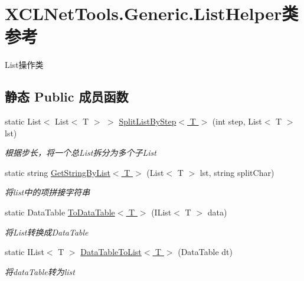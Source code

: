 \hypertarget{class_x_c_l_net_tools_1_1_generic_1_1_list_helper}{\section{X\-C\-L\-Net\-Tools.\-Generic.\-List\-Helper类 参考}
\label{class_x_c_l_net_tools_1_1_generic_1_1_list_helper}
}


List操作类  


\subsection*{静态 Public 成员函数}
\begin{DoxyCompactItemize}
\item 
static List$<$ List$<$ T $>$ $>$ \hyperlink{class_x_c_l_net_tools_1_1_generic_1_1_list_helper_a38adb871b8752fb797795645625b7b4f}{Split\-List\-By\-Step$<$ T $>$} (int step, List$<$ T $>$ lst)
\begin{DoxyCompactList}\small\item\em 根据步长，将一个总\-List拆分为多个子\-List \end{DoxyCompactList}\item 
static string \hyperlink{class_x_c_l_net_tools_1_1_generic_1_1_list_helper_a02b07a0f7a7d4506c358650ba010f7d9}{Get\-String\-By\-List$<$ T $>$} (List$<$ T $>$ lst, string split\-Char)
\begin{DoxyCompactList}\small\item\em 将list中的项拼接字符串 \end{DoxyCompactList}\item 
static Data\-Table \hyperlink{class_x_c_l_net_tools_1_1_generic_1_1_list_helper_aabb9427ae92df2eb55b7ea300be149a9}{To\-Data\-Table$<$ T $>$} (I\-List$<$ T $>$ data)
\begin{DoxyCompactList}\small\item\em 将\-List转换成\-Data\-Table \end{DoxyCompactList}\item 
static I\-List$<$ T $>$ \hyperlink{class_x_c_l_net_tools_1_1_generic_1_1_list_helper_aa1d5d2843b5a105edf4eb8c160fcd016}{Data\-Table\-To\-List$<$ T $>$} (Data\-Table dt)
\begin{DoxyCompactList}\small\item\em 将data\-Table转为list \end{DoxyCompactList}\end{DoxyCompactItemize}


